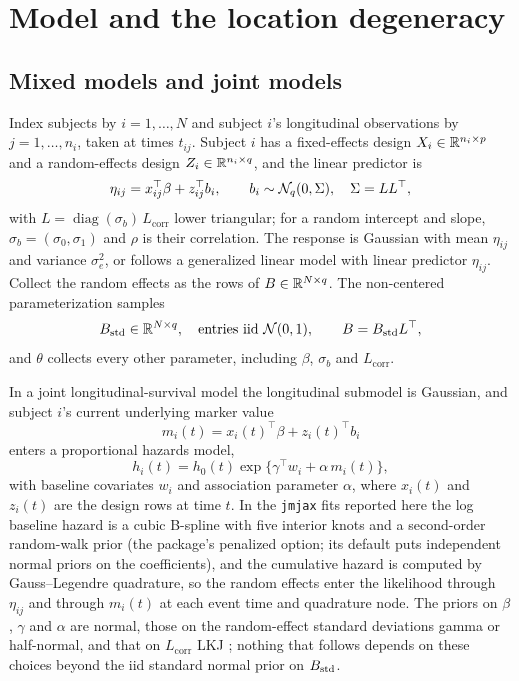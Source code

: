 \section{Model and the location degeneracy}\label{sec:model}

\subsection{Mixed models and joint models}\label{sec:setup}

Index subjects by $i = 1, \dots, N$ and subject $i$'s longitudinal
observations by $j = 1, \dots, n_i$, taken at times $t_{ij}$. Subject $i$
has a fixed-effects design $X_i \in \mathbb{R}^{n_i \times p}$ and a random-effects
design $Z_i \in \mathbb{R}^{n_i \times q}$, and the linear predictor is
\begin{equation}\label{eq:lp}
\eta_{ij} = x_{ij}^{\top}\beta + z_{ij}^{\top} b_i ,
\qquad b_i \sim \mathcal{N}_q(0, \Sigma), \quad \Sigma = L L^{\top},
\end{equation}
with $L = \operatorname{diag}(\sigma_b)\,L_{\mathrm{corr}}$ lower
triangular; for a random intercept and slope, $\sigma_b = (\sigma_0,
\sigma_1)$ and $\rho$ is their correlation. The response is Gaussian with mean $\eta_{ij}$ and variance
$\sigma_e^2$, or follows a generalized linear model with linear predictor
$\eta_{ij}$. Collect the random effects as the rows of $B \in \mathbb{R}^{N \times q}$.
The non-centered parameterization samples
\begin{equation}\label{eq:ncp}
B_{\mathrm{std}} \in \mathbb{R}^{N \times q}, \quad \text{entries iid } \mathcal{N}(0,1),
\qquad B = B_{\mathrm{std}} L^{\top},
\end{equation}
and $\theta$ collects every other parameter, including $\beta$,
$\sigma_b$ and $L_{\mathrm{corr}}$.

In a joint longitudinal-survival model the longitudinal submodel is
Gaussian, and subject $i$'s current underlying marker value
\begin{equation}\label{eq:traj}
m_i(t) = x_i(t)^{\top}\beta + z_i(t)^{\top} b_i
\end{equation}
enters a proportional hazards model,
\begin{equation}\label{eq:hazard}
h_i(t) = h_0(t)\exp\{\gamma^{\top} w_i + \alpha\, m_i(t)\},
\end{equation}
with baseline covariates $w_i$ and association parameter $\alpha$, where
$x_i(t)$ and $z_i(t)$ are the design rows at time $t$. In the \texttt{jmjax}
fits reported here the log baseline hazard is a cubic B-spline with five
interior knots and a second-order random-walk prior (the package's
penalized option; its default puts independent normal priors on the
coefficients), and the cumulative hazard is computed by Gauss--Legendre
quadrature, so the random effects enter the likelihood through $\eta_{ij}$
and through $m_i(t)$ at each event time and quadrature node. The priors on
$\beta$, $\gamma$ and $\alpha$ are normal, those on the random-effect
standard deviations gamma or half-normal, and that on $L_{\mathrm{corr}}$
LKJ \citep{lewandowski2009}; nothing that follows depends on these choices beyond the iid standard
normal prior on $B_{\mathrm{std}}$.

